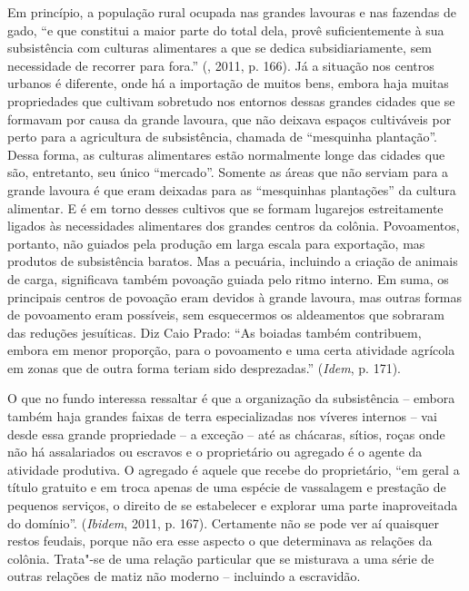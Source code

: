 Em princípio, a população rural ocupada nas grandes lavouras e nas
fazendas de gado, ``e que constitui a maior parte do total dela, provê
suficientemente à sua subsistência com culturas alimentares a que se
dedica subsidiariamente, sem necessidade de recorrer para fora.''
(, 2011, p. 166). Já a situação nos centros urbanos é diferente,
onde há a importação de muitos bens, embora haja muitas propriedades que
cultivam sobretudo nos entornos dessas grandes cidades que se formavam
por causa da grande lavoura, que não deixava espaços cultiváveis por
perto para a agricultura de subsistência, chamada de ``mesquinha
plantação''. Dessa forma, as culturas alimentares estão normalmente
longe das cidades que são, entretanto, seu único ``mercado''. Somente as
áreas que não serviam para a grande lavoura é que eram deixadas para as
``mesquinhas plantações'' da cultura alimentar. E é em torno desses
cultivos que se formam lugarejos estreitamente ligados às necessidades
alimentares dos grandes centros da colônia. Povoamentos, portanto, não
guiados pela produção em larga escala para exportação, mas produtos de
subsistência baratos. Mas a pecuária, incluindo a criação de
animais de carga, significava também povoação guiada pelo ritmo interno.
Em suma, os principais centros de povoação eram devidos à grande
lavoura, mas outras formas de povoamento eram possíveis, sem esquecermos
os aldeamentos que sobraram das reduções jesuíticas. Diz Caio Prado:
``As boiadas também contribuem, embora em menor proporção, para o
povoamento e uma certa atividade agrícola em zonas que de outra forma
teriam sido desprezadas.'' (\emph{Idem}, p. 171).

O que no fundo interessa ressaltar é que a organização da subsistência
-- embora também haja grandes faixas de terra especializadas nos víveres
internos -- vai desde essa grande propriedade -- a exceção -- até as
chácaras, sítios, roças onde não há assalariados ou escravos e o
proprietário ou agregado é o agente da atividade produtiva.
O agregado é aquele que recebe
do proprietário, ``em geral a título gratuito e em troca apenas de uma
espécie de vassalagem e prestação de pequenos serviços, o direito de se
estabelecer e explorar uma parte inaproveitada do domínio''.
(\emph{Ibidem}, 2011, p. 167). Certamente não se pode ver aí quaisquer
restos feudais, porque não era esse aspecto o que determinava as
relações da colônia. Trata"-se de uma relação particular que se misturava
a uma série de outras relações de matiz não moderno -- incluindo a
escravidão.

